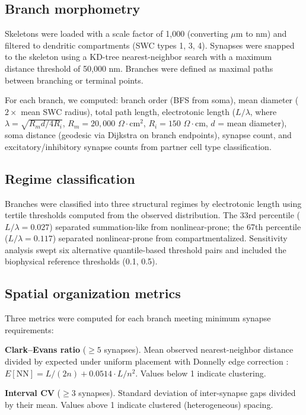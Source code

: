 \documentclass[11pt]{article}
\begin{document}
\subsection{Branch morphometry}

Skeletons were loaded with a scale factor of 1,000 (converting $\mu$m to nm) and filtered to dendritic compartments (SWC types 1, 3, 4). Synapses were snapped to the skeleton using a KD-tree nearest-neighbor search with a maximum distance threshold of 50,000 nm. Branches were defined as maximal paths between branching or terminal points.

For each branch, we computed: branch order (BFS from soma), mean diameter ($2 \times$ mean SWC radius), total path length, electrotonic length ($L/\lambda$, where $\lambda = \sqrt{R_m d / 4R_i}$, $R_m = 20{,}000$ $\Omega\cdot$cm$^2$, $R_i = 150$ $\Omega\cdot$cm, $d$ = mean diameter), soma distance (geodesic via Dijkstra on branch endpoints), synapse count, and excitatory/inhibitory synapse counts from partner cell type classification.

\subsection{Regime classification}

Branches were classified into three structural regimes by electrotonic length using tertile thresholds computed from the observed distribution. The 33rd percentile ($L/\lambda = 0.027$) separated summation-like from nonlinear-prone; the 67th percentile ($L/\lambda = 0.117$) separated nonlinear-prone from compartmentalized. Sensitivity analysis swept six alternative quantile-based threshold pairs and included the biophysical reference thresholds (0.1, 0.5).

\subsection{Spatial organization metrics}

Three metrics were computed for each branch meeting minimum synapse requirements:

\textbf{Clark--Evans ratio} ($\geq 5$ synapses). Mean observed nearest-neighbor distance divided by expected under uniform placement with Donnelly edge correction \citep{clark1954, donnelly1978}: $E[\text{NN}] = L/(2n) + 0.0514 \cdot L/n^2$. Values below 1 indicate clustering.

\textbf{Interval CV} ($\geq 3$ synapses). Standard deviation of inter-synapse gaps divided by their mean. Values above 1 indicate clustered (heterogeneous) spacing.
\end{document}
